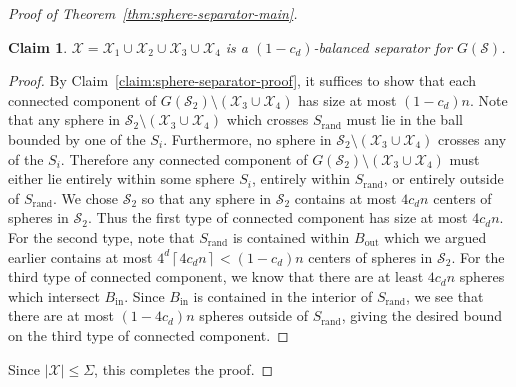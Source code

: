 \documentclass[10pt,a4paper]{amsart}
\newtheorem{claim}{Claim}
\newcommand{\ceil}[1]{\left\lceil #1 \right\rceil}
\newcommand{\fS}{\mathcal S}
\newcommand{\fX}{\mathcal X}
\begin{document}
\begin{proof}[Proof of Theorem~\ref{thm:sphere-separator-main}]
\begin{claim}
$\fX=\fX_1\cup \fX_2\cup \fX_3\cup \fX_4$ is a $(1-c_d)$-balanced separator for $G(\fS)$. 
\end{claim}
\begin{proof}
By Claim~\ref{claim:sphere-separator-proof}, it suffices to show that each connected component of $G(\fS_2)\setminus(\fX_3\cup \fX_4)$ has size at most $(1-c_d)n$. Note that any sphere in $\fS_2\setminus(\fX_3\cup \fX_4)$ which crosses $S_{\mathrm{rand}}$ must lie in the ball bounded by one of the $S_i$. Furthermore, no sphere in $\fS_2\setminus(\fX_3\cup \fX_4)$ crosses any of the $S_i$. Therefore any connected component of $G(\fS_2)\setminus(\fX_3\cup \fX_4)$ must either lie entirely within some sphere $S_i$, entirely within $S_{\mathrm{rand}}$, or entirely outside of $S_{\mathrm{rand}}$. We chose $\fS_2$ so that any sphere in $\fS_2$ contains at most $4c_dn$ centers of spheres in $\fS_2$. Thus the first type of connected component has size at most $4c_dn$. For the second type, note that $S_{\mathrm{rand}}$ is contained within $B_{\mathrm{out}}$ which we argued earlier contains at most $4^{d}\ceil{4c_dn}<(1-c_d)n$ centers of spheres in $\fS_2$. For the third type of connected component, we know that there are at least $4c_dn$ spheres which intersect $B_{\mathrm{in}}$. Since $B_{\mathrm{in}}$ is contained in the interior of $S_{\mathrm{rand}}$, we see that there are at most $(1-4c_d)n$ spheres outside of $S_{\mathrm{rand}}$, giving the desired bound on the third type of connected component.
\end{proof}
Since $|\fX|\leq\Sigma$, this completes the proof.
\end{proof}
\end{document}
